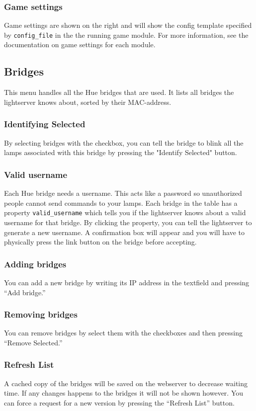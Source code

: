 \subsubsection{Game settings}
Game settings are shown on the right and will show the config template
specified by \texttt{config\_file} in the the running game module. For more
information, see the documentation on game settings for each module.


\subsection{Bridges}
This menu handles all the Hue bridges that are used. It lists all bridges the
lightserver knows about, sorted by their MAC-address.

\subsubsection{Identifying Selected}
By selecting bridges with the checkbox, you can tell the bridge to blink all
the lamps associated with this bridge by pressing the "Identify Selected"
button.

\subsubsection{Valid username}
Each Hue bridge needs a username. This acts like a password so unauthorized
people cannot send commands to your lamps. Each bridge in the table has a
property \texttt{valid\_username} which tells you if the lightserver knows about a
valid username for that bridge. By clicking the property, you can tell the
lightserver to generate a new username. A confirmation box will appear and you
will have to physically  press the link button on the bridge before accepting.

\subsubsection{Adding bridges}
You can add a new bridge by writing its IP address in the textfield and
pressing ``Add bridge.''

\subsubsection{Removing bridges}
You can remove bridges by select them with the checkboxes and then pressing
``Remove Selected.''

\subsubsection{Refresh List}
A cached copy of the bridges will be saved on the webserver to decrease
waiting time. If any changes happens to the bridges it will not be shown
however. You can force a request for a new version by pressing the ``Refresh
List'' button.

